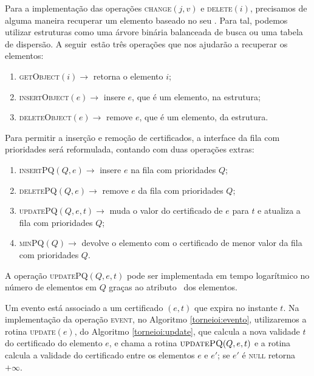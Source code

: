 Para a implementação das operações \textsc{change}$(j, v)$ e
\textsc{delete}$(i)$, precisamos de alguma maneira recuperar um
elemento baseado no seu \id. Para tal, podemos utilizar estruturas
como uma árvore binária balanceada de busca ou uma tabela de
dispersão. A seguir~estão três operações que nos ajudarão a
recuperar os elementos:
\begin{enumerate}
    \item \textsc{getObject}$(i)\rightarrow$ retorna o elemento $i$;
    \item \textsc{insertObject}$(e) \rightarrow$ insere $e$, que é
    um elemento, na estrutura;
    \item \textsc{deleteObject}$(e) \rightarrow$ remove $e$, que é
    um elemento, da estrutura.
\end{enumerate}
Para permitir a inserção e remoção de certificados, a interface da
fila com prioridades será reformulada, contando com duas operações
extras:
\begin{enumerate}
    \item \textsc{insertPQ}$(Q, e) \rightarrow$ insere $e$ na fila
    com prioridades $Q$;
    \item \textsc{deletePQ}$(Q, e) \rightarrow$ remove $e$ da fila
    com prioridades $Q$;
    \item \textsc{updatePQ}$(Q,e,t) \rightarrow$ muda o valor do
    certificado de $e$ para $t$ e atualiza a fila com prioridades
    $Q$;
    \item \textsc{minPQ}$(Q) \rightarrow$ devolve o elemento com o
    certificado de menor valor da fila com prioridades $Q$.
\end{enumerate}
A operação \textsc{updatePQ}$(Q,e,t)$ pode ser implementada em tempo
logarítmico no número de elementos em $Q$ graças ao atributo
\pqpos~dos elementos.

Um evento está associado a um certificado $(e, t)$ que expira no
instante $t$. Na implementação da operação \textsc{event}, no
Algoritmo \ref{torneioi:evento}, utilizaremos a rotina
\textsc{update}$(e)$, do Algoritmo \ref{torneioi:update}, que
calcula a nova validade $t$ do certificado do elemento $e$, e chama
a rotina $\textsc{updatePQ}(Q, e, t)$ e a rotina
 calcula a validade do certificado entre os
elementos $e$ e $e'$; se $e'$ é \textsc{null} retorna $+\infty$.





